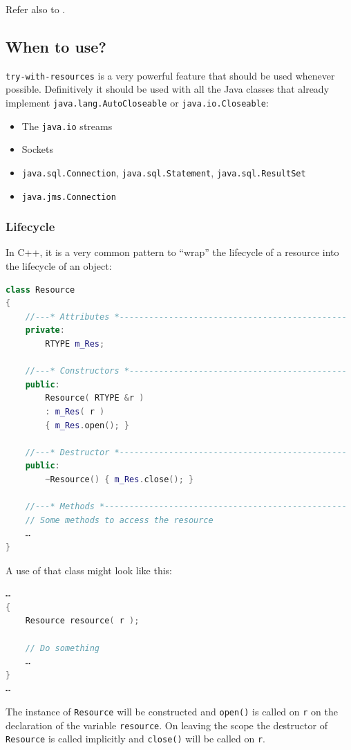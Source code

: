 \documentclass[11pt,a4paper, titlepage, parskip=half, headsepline, footsepline, cleardoublepage=current, headheight=1cm]{scrbook}
\begin{document}
Refer also to \autocite{ORACLE_DOC_LANGUAGE_SPECIFICATION:ExtendedTryWithResources}.

\subsection{When to use?}
\lstinline|try-with-resources| is a very powerful feature that should be used whenever possible. Definitively it should be used with all the Java classes that already implement \lstinline|java.lang.AutoCloseable| or \lstinline|java.io.Closeable|:

\begin{itemize}
\item{The \lstinline|java.io| streams}
\item{Sockets}
\item{\lstinline|java.sql.Connection|, \lstinline|java.sql.Statement|, \lstinline|java.sql.ResultSet|}
\item{\lstinline|java.jms.Connection|}
\end{itemize}

\subsubsection{Lifecycle}\label{sec:Lifecycle}
In C++, it is a very common pattern to “wrap” the lifecycle of a resource into the lifecycle of an object:
\begin{lstlisting}[language=C++]
class Resource
{
    //---* Attributes *----------------------------------------------
    private:
        RTYPE m_Res;

    //---* Constructors *--------------------------------------------
    public:
        Resource( RTYPE &r )
        : m_Res( r )
        { m_Res.open(); }

    //---* Destructor *----------------------------------------------
    public:
        ~Resource() { m_Res.close(); }

    //---* Methods *-------------------------------------------------
    // Some methods to access the resource
    …
}
\end{lstlisting}
A use of that class might look like this:
\begin{lstlisting}[language=c++]
…
{
    Resource resource( r );

    // Do something
    …
}
…
\end{lstlisting}
The instance of \lstinline|Resource| will be constructed and \lstinline|open()| is called on \lstinline|r| on the declaration of the variable \lstinline|resource|. On leaving the scope the destructor of \lstinline|Resource| is called implicitly and \lstinline|close()| will be called on \lstinline|r|.
\end{document}

